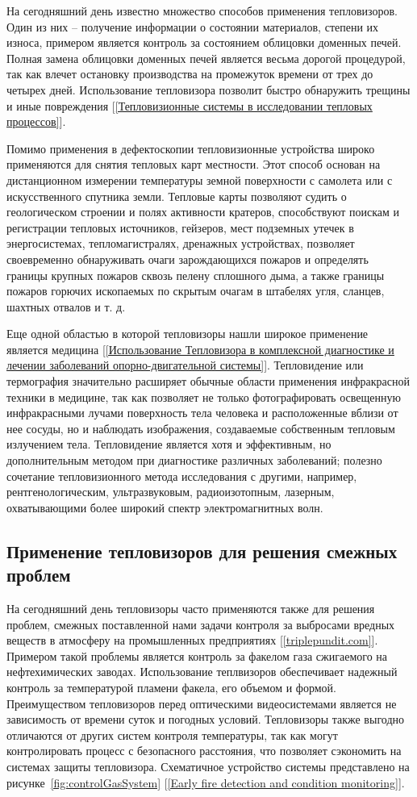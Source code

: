 \documentclass[14pt, a4paper]{extreport}
\begin{document}
	На сегодняшний день известно множество способов применения тепловизоров. Один из них -- получение информации о состоянии материалов, степени их износа, примером является контроль за состоянием облицовки доменных печей. Полная замена облицовки доменных печей является весьма дорогой процедурой, так как влечет остановку производства на промежуток времени от трех до четырех дней. Использование тепловизора позволит быстро обнаружить трещины и иные повреждения [\ref{Тепловизионные системы в исследовании тепловых процессов}].
	
	Помимо применения в дефектоскопии тепловизионные устройства широко применяются для снятия тепловых карт местности. Этот способ основан на дистанционном измерении температуры земной поверхности с самолета или с искусственного спутника земли. Тепловые карты позволяют судить о геологическом строении и полях активности кратеров, способствуют поискам и регистрации тепловых источников, гейзеров, мест подземных утечек в энергосистемах, тепломагистралях, дренажных устройствах, позволяет своевременно обнаруживать очаги зарождающихся пожаров и определять границы крупных пожаров сквозь пелену сплошного дыма, а также границы пожаров горючих ископаемых по скрытым очагам в штабелях угля, сланцев, шахтных отвалов и т. д.
	
	Еще одной областью в которой тепловизоры нашли широкое применение является медицина [\ref{Использование Тепловизора в комплексной
		диагностике и лечении заболеваний опорно-двигательной системы}]. Тепловидение или термография значительно расширяет обычные области применения инфракрасной техники в медицине, так как позволяет не только фотографировать освещенную инфракрасными лучами поверхность тела человека и расположенные вблизи от нее сосуды, но и наблюдать изображения, создаваемые собственным тепловым излучением тела. Тепловидение является хотя и эффективным, но дополнительным методом при диагностике различных заболеваний; полезно сочетание тепловизионного метода исследования с другими, например, рентгенологическим, ультразвуковым, радиоизотопным, лазерным, охватывающими более широкий спектр электромагнитных волн.
	
	\subsection{Применение тепловизоров для решения смежных проблем}
	На сегодняшний день тепловизоры часто применяются также для решения проблем, смежных поставленной нами задачи контроля за выбросами вредных веществ в атмосферу на промышленных предприятиях [\ref{triplepundit.com}]. Примером такой проблемы является контроль за факелом газа сжигаемого на нефтехимических заводах. Использование теплвизоров обеспечивает надежный контроль за температурой пламени факела, его объемом и формой. Преимуществом тепловизоров перед оптическими видеосистемами является не зависимость от времени суток и погодных условий. Тепловизоры также выгодно отличаются от других систем контроля температуры, так как могут контролировать процесс с безопасного расстояния, что позволяет сэкономить на системах защиты тепловизора. Схематичное устройство системы представлено на рисунке~\ref{fig:controlGasSystem} [\ref{Early fire detection and condition monitoring}].
	
\end{document}
